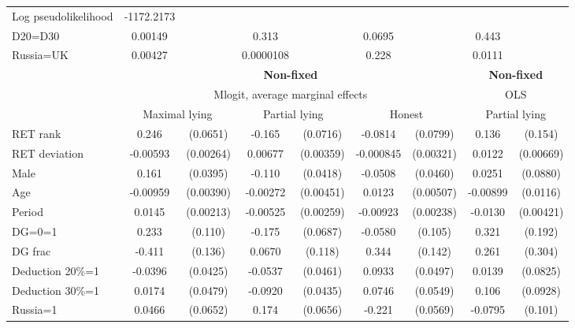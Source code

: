 \begin{tabular}{l|cccccc|cc}
Log pseudolikelihood  & -1172.2173   &         &                  &         &                  &         &           &   \\ 
D20=D30         &  0.00149         &         &    0.313         &         &   0.0695         &         &    0.443         &         \\
Russia=UK       &  0.00427         &         &0.0000108         &         &    0.228         &         &   0.0111         &         \\
\hline\hline
&\multicolumn{6}{c|}{\bf Non-fixed}&\multicolumn{2}{c}{\bf Non-fixed}\\ &\multicolumn{6}{c|}{Mlogit, average marginal effects }&\multicolumn{2}{c}{OLS}\\
                &\multicolumn{2}{c}{Maximal lying}&\multicolumn{2}{c}{Partial lying}&\multicolumn{2}{c}{Honest}  &\multicolumn{2}{c}{Partial lying}\\
\hline
RET rank        &    0.246\sym{***}& (0.0651)&   -0.165\sym{**} & (0.0716)&  -0.0814         & (0.0799)&    0.136         &  (0.154)\\
RET deviation   & -0.00593\sym{**} &(0.00264)&  0.00677\sym{*}  &(0.00359)&-0.000845         &(0.00321)&   0.0122\sym{*}  &(0.00669)\\
Male            &    0.161\sym{***}& (0.0395)&   -0.110\sym{***}& (0.0418)&  -0.0508         & (0.0460)&   0.0251         & (0.0880)\\
Age             & -0.00959\sym{**} &(0.00390)& -0.00272         &(0.00451)&   0.0123\sym{**} &(0.00507)& -0.00899         & (0.0116)\\
Period          &   0.0145\sym{***}&(0.00213)& -0.00525\sym{**} &(0.00259)& -0.00923\sym{***}&(0.00238)&  -0.0130\sym{***}&(0.00421)\\
DG=0=1          &    0.233\sym{**} &  (0.110)&   -0.175\sym{**} & (0.0687)&  -0.0580         &  (0.105)&    0.321\sym{*}  &  (0.192)\\
DG frac         &   -0.411\sym{***}&  (0.136)&   0.0670         &  (0.118)&    0.344\sym{**} &  (0.142)&    0.261         &  (0.304)\\
Deduction 20\%=1&  -0.0396         & (0.0425)&  -0.0537         & (0.0461)&   0.0933\sym{*}  & (0.0497)&   0.0139         & (0.0825)\\
Deduction 30\%=1&   0.0174         & (0.0479)&  -0.0920\sym{**} & (0.0435)&   0.0746         & (0.0549)&    0.106         & (0.0928)\\
Russia=1        &   0.0466         & (0.0652)&    0.174\sym{***}& (0.0656)&   -0.221\sym{***}& (0.0569)&  -0.0795         &  (0.101)\\

\end{tabular}
